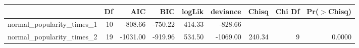 \begin{table}[ht]
\centering
\begin{tabular}{lrrrrrrrr}
  \hline
 & Df & AIC & BIC & logLik & deviance & Chisq & Chi Df & Pr($>$Chisq) \\ 
  \hline
normal\_popularity\_times\_1 & 10 & -808.66 & -750.22 & 414.33 & -828.66 &  &  &  \\ 
  normal\_popularity\_times\_2 & 19 & -1031.00 & -919.96 & 534.50 & -1069.00 & 240.34 & 9 & 0.0000 \\ 
   \hline
\end{tabular}
\end{table}
